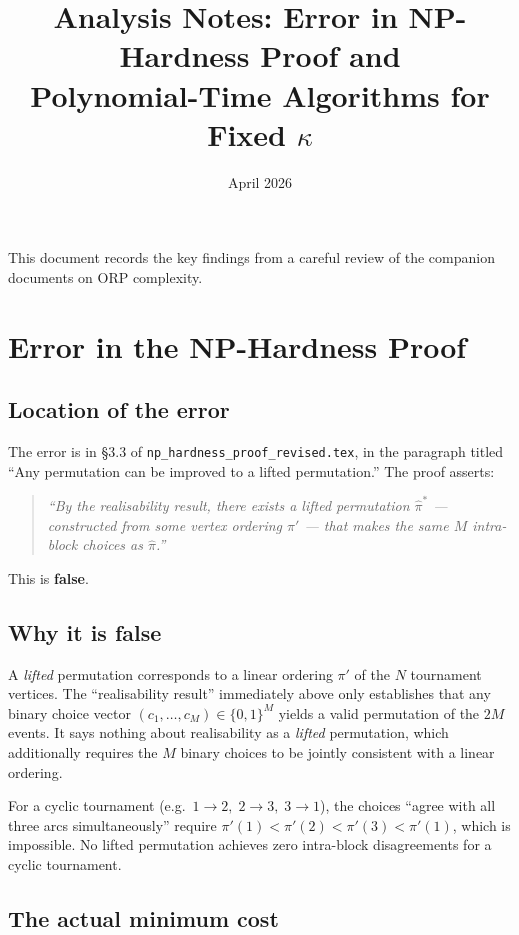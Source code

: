 \documentclass[11pt]{article}
\title{Analysis Notes: Error in NP-Hardness Proof and\\Polynomial-Time Algorithms for Fixed $\kappa$}
\date{April 2026}
\begin{document}
\maketitle

\noindent This document records the key findings from a careful review of the
companion documents on ORP complexity.

\section{Error in the NP-Hardness Proof}

\subsection{Location of the error}

The error is in \S3.3 of \texttt{np\_hardness\_proof\_revised.tex}, in the paragraph
titled ``Any permutation can be improved to a lifted permutation.''  The proof
asserts:

\begin{quote}
\emph{``By the realisability result, there exists a lifted permutation $\hat{\pi}^*$
--- constructed from some vertex ordering $\pi'$ --- that makes the same $M$
intra-block choices as $\hat{\pi}$.''}
\end{quote}

\noindent This is \textbf{false}.

\subsection{Why it is false}

A \emph{lifted} permutation corresponds to a linear ordering $\pi'$ of the $N$
tournament vertices.  The ``realisability result'' immediately above only establishes
that any binary choice vector $(c_1, \ldots, c_M) \in \{0,1\}^M$ yields a valid
permutation of the $2M$ events.  It says nothing about realisability as a
\emph{lifted} permutation, which additionally requires the $M$ binary choices to be
jointly consistent with a linear ordering.

For a cyclic tournament (e.g.\ $1 \to 2,\; 2 \to 3,\; 3 \to 1$), the choices
``agree with all three arcs simultaneously'' require
$\pi'(1) < \pi'(2) < \pi'(3) < \pi'(1)$, which is impossible.  No lifted permutation
achieves zero intra-block disagreements for a cyclic tournament.

\subsection{The actual minimum cost}
\end{document}

